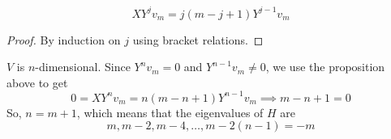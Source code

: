   \begin{proposition}
    \begin{equation}
      X Y^j v_m = j(m-j+1) Y^{j-1} v_m
    \end{equation}
  \end{proposition}
  \begin{proof}
    By induction on $j$ using bracket relations.
  \end{proof}

  $V$ is $n$-dimensional. Since $Y^n v_m = 0$ and $Y^{n-1} v_m \neq 0$, we use the proposition above to get
  \begin{equation}
    0 = X Y^n v_m = n (m-n+1) Y^{n-1} v_m \implies m-n+1=0
  \end{equation}
  So, $n = m+1$, which means that the eigenvalues of $H$ are
  \begin{equation}
    m, m-2, m-4, \ldots, m - 2(n-1) = -m
  \end{equation}

